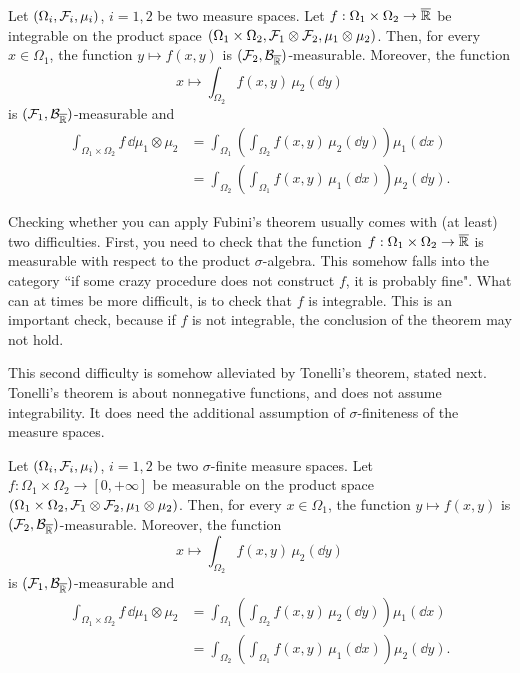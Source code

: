 \begin{theorem}
Let $(\Omega_i, \mathcal F_i, \mu_i)$, $i=1,2$ be two measure spaces. 
Let $f : \Omega_1 \times \Omega_2 \to \overline{\mathbb R}$ be integrable on the product space $(\Omega_1 \times \Omega_2, \mathcal F_1 \otimes \mathcal F_2, \mu_1 \otimes \mu_2)$. Then, for every $x \in \Omega_1$, the function $y \mapsto f(x, y)$ is $(\mathcal F_2,\mathcal B_{\overline{\mathbb R}})$-measurable. Moreover, the function 
\[
x \mapsto \int_{\Omega_2} f(x,y)\,  \mu_2(\dd y)
\]
is $(\mathcal F_1,\mathcal B_{\overline{\mathbb R}})$-measurable and
\[
\begin{split}
\int_{\Omega_1 \times \Omega_2} f\, \dd \mu_1 \otimes \mu_2 
&= \int_{\Omega_1} \left( \int_{\Omega_2 } f(x,  y ) \,\mu_2(\dd y) \right) \mu_1(\dd x)\\
&= \int_{\Omega_2} \left( \int_{\Omega_1} f(x, y) \, \mu_1(\dd x) \right) \mu_2(\dd y).
\end{split}
\] 
\end{theorem}

Checking whether you can apply Fubini's theorem usually comes with (at least) two difficulties. First, you need to check that the function $f: \Omega_1 \times \Omega_2 \to \overline{\mathbb R}$ is measurable with respect to the product $\sigma$-algebra. This somehow falls into the category ``if some crazy procedure does not construct $f$, it is probably fine". What can at times be more difficult, is to check that $f$ is integrable. This is an important check, because if $f$ is not integrable, the conclusion of the theorem may not hold.

This second difficulty is somehow alleviated by Tonelli's theorem, stated next. Tonelli's theorem is about nonnegative functions, and does not assume integrability. It does need the additional assumption of $\sigma$-finiteness of the measure spaces.

\begin{theorem}
	Let $(\Omega_i, \mathcal F_i, \mu_i)$, $i=1,2$ be two $\sigma$-finite measure spaces. 
	Let $f : \Omega_1 \times \Omega_2 \to [0,+\infty]$ be measurable on the product space $(\Omega_1 \times \Omega_2, \mathcal F_1 \otimes \mathcal F_2, \mu_1 \otimes \mu_2)$. Then, for every $x \in \Omega_1$, the function $y \mapsto f(x, y)$ is $(\mathcal F_2,\mathcal B_{\overline{\mathbb R}})$-measurable. Moreover, the function 
	\[
	x \mapsto \int_{\Omega_2} f(x,y)\, \mu_2(\dd y)
	\]
	is $(\mathcal F_1,\mathcal B_{\overline{\mathbb R}})$-measurable and
	\[
	\begin{split}
	\int_{\Omega_1 \times \Omega_2} f\, \dd \mu_1 \otimes \mu_2 
	&= \int_{\Omega_1} \left( \int_{\Omega_2 } f(x,  y ) \,\mu_2(\dd y) \right) \mu_1(\dd x)\\
	&= \int_{\Omega_2} \left( \int_{\Omega_1} f(x, y)  \,\mu_1(\dd x) \right) \mu_2(\dd y).
	\end{split}
	\] 
\end{theorem}

